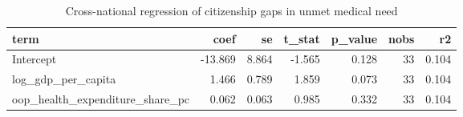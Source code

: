 \begin{table}
\caption{Cross-national regression of citizenship gaps in unmet medical need}
\label{tab:citizenship_gap_regression}
\begin{tabular}{lrrrrrr}
\toprule
term & coef & se & t\_stat & p\_value & nobs & r2 \\
\midrule
Intercept & -13.869 & 8.864 & -1.565 & 0.128 & 33 & 0.104 \\
log\_gdp\_per\_capita & 1.466 & 0.789 & 1.859 & 0.073 & 33 & 0.104 \\
oop\_health\_expenditure\_share\_pc & 0.062 & 0.063 & 0.985 & 0.332 & 33 & 0.104 \\
\bottomrule
\end{tabular}
\end{table}
